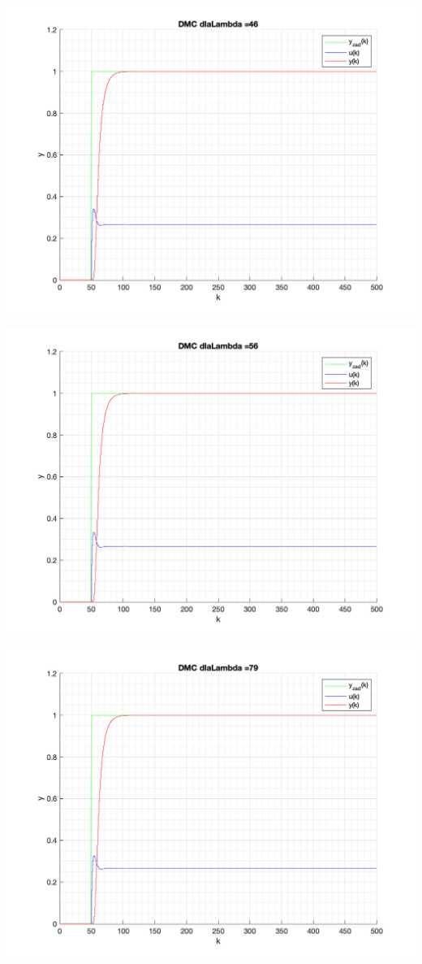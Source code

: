 \documentclass[a4paper, 11pt]{article}
\begin{document}
\begin{enumerate}
 \includegraphics[width=\linewidth]{./ModelsP4_Lambda/P4_DMC_Lambda_46_png.png} 
 
 \includegraphics[width=\linewidth]{./ModelsP4_Lambda/P4_DMC_Lambda_56_png.png} 
 
 \includegraphics[width=\linewidth]{./ModelsP4_Lambda/P4_DMC_Lambda_79_png.png} 
 

\end{enumerate}
\end{document}
